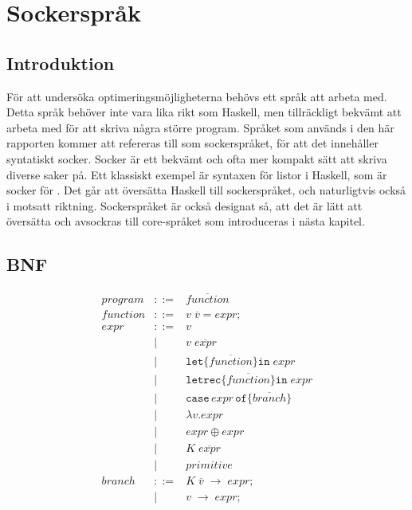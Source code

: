 \documentclass[Rapport]{subfiles}
\begin{document}
\section{Sockerspråk}

%
%
%
%
%
%
%

%

\subsection{Introduktion}

För att undersöka optimeringsmöjligheterna behövs ett språk att arbeta med. 
Detta språk behöver inte vara lika rikt som Haskell, men tillräckligt bekvämt
att arbeta med för att skriva några större program. Språket som används i den
här rapporten kommer att refereras till som sockerspråket, för att det 
innehåller syntatiskt socker. Socker är ett bekvämt och ofta mer kompakt sätt 
att skriva diverse saker på. Ett klassiskt exempel är syntaxen
för listor i Haskell, \miniCode{[5,0,4]} som är socker för .
    Det går att översätta Haskell till sockerspråket, och naturligtvis också
i motsatt riktning. Sockerspråket är också designat så, att det är lätt att
översätta och avsockras till core-språket som introduceras i nästa kapitel. 

\subsection{BNF}

\begin{equation*}
\begin{aligned}
program &::=& \overline{function} \\
function &::=& v \; \overline{v} \mathtt{=} expr \mathtt{;} \\
expr &::=& v \\
       &|& v \; \overline{expr}  \\
       &|& \mathtt{let \{} \overline{function} \mathtt{\} in }\; expr \\
       &|& \mathtt{letrec \{} \overline{function} \mathtt{\} in} \; expr \\
       &|& \mathtt{case}\,expr\,\mathtt{of \{} \overline{branch} \mathtt{\}} \\
       &|& \mathtt{\lambda } v \mathtt{.} expr \\
       &|& expr \oplus expr \\
       &|& K \; \overline{expr} \\
       &|& primitive \\
branch &::=& K \; \overline{v} \; \mathtt{\rightarrow} \; expr \mathtt{;} \\
         &|& v \; \mathtt{\rightarrow} \; expr \mathtt{;}
\end{aligned}
\end{equation*}
\end{document}
